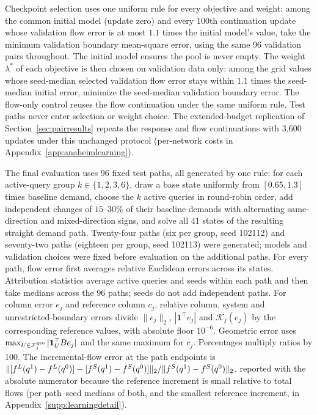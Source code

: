 Checkpoint selection uses one uniform rule for every objective and
weight: among the common initial model (update zero) and every 100th
continuation update whose validation flow error is at most $1.1$ times
the initial model's value, take the minimum validation boundary
mean-square error, using the same 96 validation pairs throughout. The
initial model ensures the pool is never empty. The weight $\lambda^*$ of
each objective is then chosen on validation data only: among the grid
values whose seed-median selected validation flow error stays within
$1.1$ times the seed-median initial error, minimize the seed-median
validation boundary error. The flow-only control reuses the flow
continuation under the same uniform rule. Test paths never enter
selection or weight choice. The extended-budget replication of
Section~\ref{sec:pairresults} repeats the response and flow
continuations with 3{,}600 updates under this unchanged protocol
(per-network costs in Appendix~\ref{app:anaheimlearning}).

The final evaluation uses 96 fixed test paths, all generated by one
rule: for each active-query group $k\in\{1,2,3,6\}$, draw a base state
uniformly from $[0.65,1.3]$ times baseline demand, choose the $k$
active queries in round-robin order, add independent changes of
$15$--$30\%$ of their baseline demands with alternating same-direction
and mixed-direction signs, and solve all 41 states of the resulting
straight demand path. Twenty-four paths (six per group, seed 102112)
and seventy-two paths (eighteen per group, seed 102113) were generated;
models and validation choices were fixed before evaluation on the
additional paths. For every path, flow error first averages relative
Euclidean errors across its states. Attribution statistics average active
queries and seeds within each path and then take medians across the 96 paths;
seeds do not add independent paths. For column error $e_j$ and reference column
$c_j$, relative column, system and unrestricted-boundary errors divide
$\|e_j\|_2$, $|\mathbf1^\top e_j|$ and $\mathcal K_j(e_j)$ by the
corresponding reference values, with absolute floor $10^{-6}$. Geometric error
uses $\max_{U\in\mathcal F_j^{\rm geo}}|\mathbf1_U^\top Be_j|$ and
the same maximum for $c_j$. Percentages multiply ratios by 100. The
incremental-flow error at the path endpoints is
$\lVert [f^L(q^1)-f^L(q^0)]-[f^S(q^1)-f^S(q^0)] \rVert_2/\lVert f^S(q^1)-f^S(q^0) \rVert_2$,
reported with the absolute numerator because the reference increment
is small relative to total flows (per path--seed medians of both, and
the smallest reference increment, in
Appendix~\ref{supp:learningdetail}).

